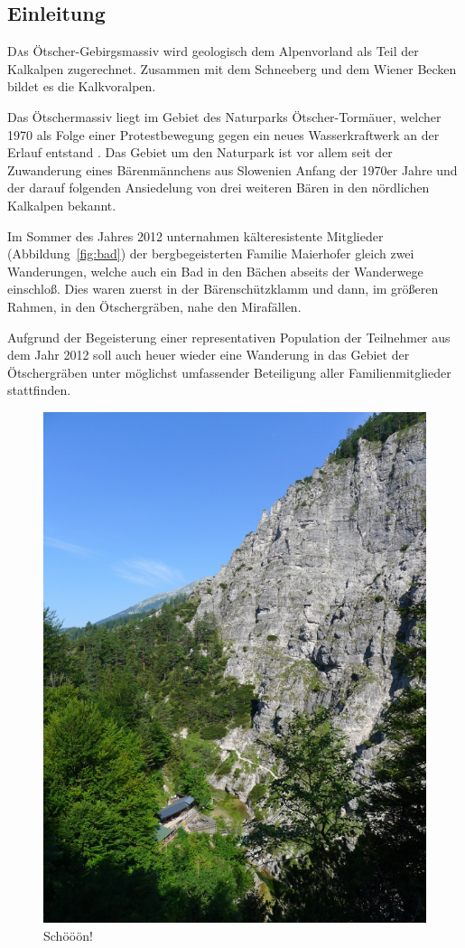 \documentclass[twoside]{article}
\begin{document}
\begin{multicols}{2} %

\section{Einleitung}

\lettrine[nindent=0em,lines=3]{D} as Ötscher-Gebirgsmassiv wird geologisch dem Alpenvorland als Teil der
Kalkalpen zugerechnet. Zusammen mit dem Schneeberg und dem Wiener Becken bildet es die Kalkvoralpen. \cite{SH:2012}

Das Ötschermassiv liegt im Gebiet des Naturparks Ötscher-Tormäuer, welcher 1970 als Folge einer Protestbewegung gegen ein neues Wasserkraftwerk an der Erlauf
entstand \cite{NOT:2013:Online}. Das Gebiet um den Naturpark ist vor allem seit der Zuwanderung eines Bärenmännchens aus Slowenien Anfang der 1970er Jahre und
der darauf folgenden Ansiedelung von drei weiteren Bären in den nördlichen Kalkalpen bekannt.

Im Sommer des Jahres 2012 unternahmen kälteresistente Mitglieder (Abbildung~\ref{fig:bad}) der
bergbegeisterten Familie Maierhofer gleich zwei Wanderungen, welche auch ein Bad in den
Bächen abseits der Wanderwege einschloß. Dies waren zuerst in der Bärenschützklamm und dann, im größeren Rahmen, in den Ötschergräben, nahe den Mirafällen.

Aufgrund der Begeisterung einer representativen Population der Teilnehmer aus dem Jahr 2012 soll auch heuer wieder eine Wanderung in das Gebiet der
Ötschergräben unter möglichst umfassender Beteiligung aller Familienmitglieder stattfinden.
\begin{figure}[H]
\begin{center}
  \includegraphics[trim = 0 15 0 0, clip, natwidth=600, natheight=800, width=.45\textwidth]{Figures/oetschergraeben.jpg}
\end{center}
\caption{Schööön!}
\label{fig:oetschergraeben}
\end{figure}


\end{multicols}
\end{document}
